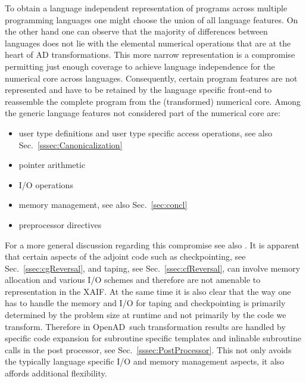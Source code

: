 \documentclass[11pt]{article}
\newcommand{\OpenAD}{OpenAD}
\newcommand{\xaif}{XAIF}
\newcommand{\refsec}[1]{{Sec.~\ref{#1}}}
\begin{document}
To obtain a language independent representation of programs across multiple 
programming languages one might choose the union of all language features. 
On the other hand one can observe that the majority of differences between 
languages does not lie with the elemental numerical operations that are at the 
heart of AD transformations. This more narrow representation 
is a compromise permitting just enough coverage to achieve language 
independence for the numerical core across languages.
Consequently, certain program features are not represented and have 
to be retained by the language specific front-end to reassemble the 
complete program from the (transformed) numerical core.
Among the generic language features not considered part of the numerical core are: 
\begin{itemize}
\item user type definitions and user type specific access operations, see also \refsec{sssec:Canonicalization}
\item pointer arithmetic
\item I/O operations  
\item memory management, see also \refsec{sec:concl}
\item preprocessor directives
\end{itemize}
For a more general discussion regarding this compromise see also \cite{sea2000something}.
It is apparent that certain aspects of the adjoint code such as 
checkpointing, see \refsec{ssec:cgReversal}, and taping, see \refsec{ssec:cfReversal},
can involve memory allocation and various I/O schemes and therefore 
are not amenable to representation in the \xaif. 
At the same time it is also clear that the way  one has to handle the memory and I/O for 
taping and checkpointing is primarily determined by the problem size at runtime and not
primarily by the code we transform.   
Therefore in \OpenAD\ such transformation results are handled by  specific 
code expansion for subroutine specific templates and inlinable subroutine calls 
in the post processor, see \refsec{sssec:PostProcessor}. This not only avoids 
the typically language specific I/O and memory management aspects, it also 
affords additional flexibility.   
\end{document}
